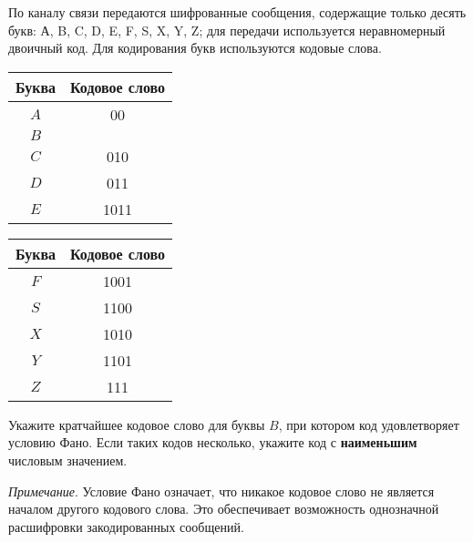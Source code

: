 \documentclass[14pt,a4paper]{article}
\begin{document}
По каналу связи передаются шифрованные сообщения, содержащие только
десять букв: А, B, C, D, E, F, S, X, Y, Z; для передачи используется
неравномерный двоичный код. Для кодирования букв используются
кодовые слова.

\begin{center}
	\begin{tabular}{|c|c|}
		\hline
		\textbf{Буква} & \textbf{Кодовое слово} \\ \hline
		$A$        & 00                     \\ \hline
		$B$        &                        \\ \hline
		$C$        & 010                    \\ \hline
		$D$        & 011                    \\ \hline
		$E$        & 1011                   \\ \hline
	\end{tabular}
	\quad
	\begin{tabular}{|c|c|}
		\hline
		\textbf{Буква} & \textbf{Кодовое слово} \\ \hline
		$F$        & 1001                   \\ \hline
		$S$        & 1100                   \\ \hline
		$X$        & 1010                   \\ \hline
		$Y$        & 1101                   \\ \hline
		$Z$        & 111                    \\ \hline
	\end{tabular}
\end{center}

Укажите кратчайшее кодовое слово для буквы $B$, при котором код
удовлетворяет условию Фано. Если таких кодов несколько, укажите код с
\textbf{наименьшим} числовым значением.

\textit{Примечание}. Условие Фано означает, что никакое кодовое слово
не является началом другого кодового слова. Это обеспечивает
возможность однозначной расшифровки закодированных сообщений.
\end{document}

